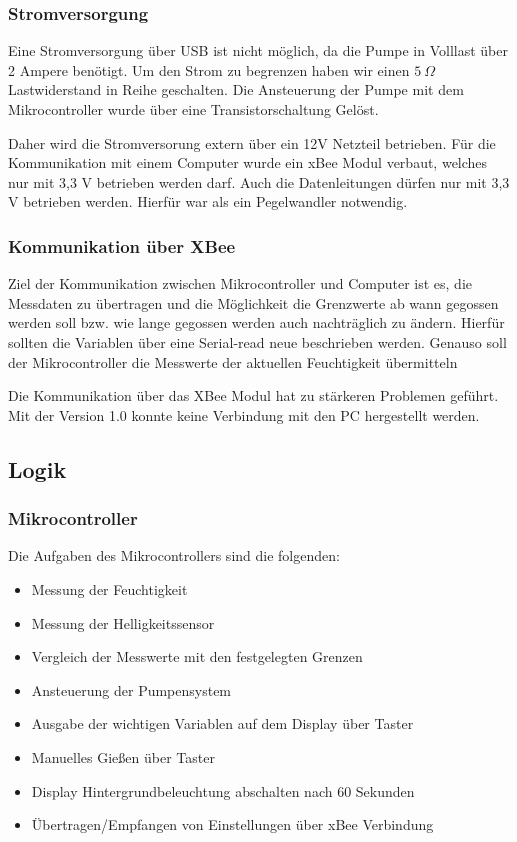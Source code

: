 \documentclass[]{IEEEtran}
\begin{document}
	\subsubsection{Stromversorgung}
	Eine Stromversorgung über USB ist nicht möglich, da die Pumpe in Volllast über 2 Ampere benötigt. Um den Strom zu begrenzen haben wir einen \begin{math}5~\Omega\end{math} Lastwiderstand in Reihe geschalten. Die Ansteuerung der Pumpe mit dem Mikrocontroller wurde über eine Transistorschaltung Gelöst. 

	Daher wird die Stromversorung extern über ein 12V Netzteil betrieben. Für die Kommunikation mit einem Computer wurde ein xBee Modul verbaut, welches nur mit 3,3 V betrieben werden darf. Auch die Datenleitungen dürfen nur mit 3,3 V betrieben werden. Hierfür war als ein Pegelwandler notwendig.
	
	\subsubsection{Kommunikation über XBee}
	Ziel der Kommunikation zwischen Mikrocontroller und Computer ist es, die Messdaten zu übertragen und die Möglichkeit die Grenzwerte ab wann gegossen werden soll bzw. wie lange gegossen werden auch nachträglich zu ändern. Hierfür sollten die Variablen über eine Serial-read neue beschrieben werden. Genauso soll der Mikrocontroller die Messwerte der aktuellen  Feuchtigkeit übermitteln
	
	Die Kommunikation über das XBee Modul hat zu stärkeren Problemen geführt. Mit der Version 1.0 konnte keine Verbindung mit den PC hergestellt werden.
	
	\subsection{Logik}
	
		\subsubsection{Mikrocontroller}
		
		Die Aufgaben des Mikrocontrollers sind die folgenden:
			\begin{itemize}
				\item Messung der Feuchtigkeit
				\item Messung der Helligkeitssensor
				\item Vergleich der Messwerte mit den festgelegten Grenzen
				\item Ansteuerung der Pumpensystem
				\item Ausgabe der wichtigen Variablen auf dem Display über Taster
				\item Manuelles Gießen über Taster
				\item Display Hintergrundbeleuchtung abschalten nach 60  Sekunden
				\item Übertragen/Empfangen von Einstellungen über xBee Verbindung
			\end{itemize}
		
\end{document}
